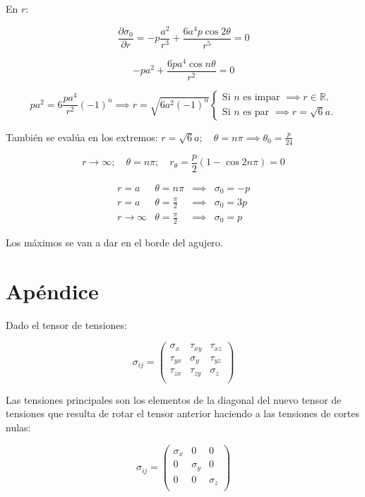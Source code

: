 \documentclass[a4paper,12pt,twoside,final,spanish]{article}
\begin{document}
En $r$:

\[
\frac{\partial\sigma_{0}}{\partial r}
=-p\frac{a^{2}}{r^{3}}+\frac{6a^{4}p\cos 2\theta}{r^{5}}=0
\]

\[
-pa^{2}+\frac{6pa^{4}\cos{n\theta}}{r^{2}}=0
\]

\[
pa^{2}=6\frac{pa^{4}}{r^{2}}(-1)^{n}
\implies
r=\sqrt{6a^{2}(-1)^{n}}
\left\{
\begin{array}{l}
\text{Si $n$ es impar $\implies r\in\mathbb{R}$.} \\
\text{Si $n$ es par $\implies r=\sqrt{6}a$.}
\end{array}
\right.
\]

También se evalúa en los extremos: 
$r=\sqrt{6}a;\quad
\theta=n\pi \implies \theta_{0}=\frac{p}{24}$

\[
r\to\infty;  \quad
\theta=n\pi; \quad
r_{\theta}=\frac{p}{2}(1-\cos{2n\pi})=0
\]

\[
\begin{array}{llcl}
r=a        & \theta=n\pi          & \implies & \sigma_{0}=-p \\
r=a        & \theta=\frac{\pi}{2} & \implies & \sigma_{0}=3p \\
r\to\infty & \theta=\frac{\pi}{2} & \implies & \sigma_{0}=p
\end{array}
\]

Los máximos se van a dar en el borde del agujero.

\section*{Apéndice}

Dado el tensor de tensiones:

\[
\sigma_{ij}=
\left(\begin{matrix}
\sigma_{x} & \tau_{xy} & \tau_{xz}\\
\tau_{yx} & \sigma_{y} & \tau_{yz}\\
\tau_{zx} & \tau_{zy} & \sigma_{z}\\
\end{matrix}\right)
\]

Las tensiones principales son los elementos de la diagonal del nuevo tensor de tensiones que resulta de rotar el tensor anterior haciendo a las tensiones de cortes nulas:

\[
\sigma_{ij}=
\left(\begin{matrix}
\sigma_{x} & 0 & 0\\
0 & \sigma_{y} & 0\\
0 & 0 & \sigma_{z}\\
\end{matrix}\right)
\]
\end{document}
